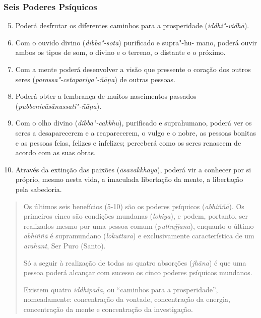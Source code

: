 \clearpage

\subsubsection{Seis Poderes Psíquicos}


\begin{enumerate}
  \setcounter{enumi}{4}
  \item Poderá desfrutar os diferentes caminhos para a prosperidade (\emph{iddhi"-vidhā}).

  \item Com o ouvido divino (\emph{dibba"-sota}) purificado e supra"-hu- mano,
        poderá ouvir ambos os tipos de som, o divino e o terreno, o distante e o
        próximo.

  \item Com a mente poderá desenvolver a visão que pressente o coração dos
        outros seres (\emph{parassa"-cetopariya"-ñāṇa}) de outras pessoas.

  \item Poderá obter a lembrança de muitos nascimentos passados
        (\emph{pubbenivāsānussati"-ñāṇa}).

  \item Com o olho divino (\emph{dibba"-cakkhu}), purificado e suprahumano,
        poderá ver os seres a desaparecerem e a reaparecerem, o vulgo e o nobre,
        as pessoas bonitas e as pessoas feias, felizes e infelizes; perceberá
        como os seres renascem de acordo com as suas obras.

  \item Através da extinção das paixões (\emph{āsavakkhaya}), poderá vir a
        conhecer por si próprio, mesmo nesta vida, a imaculada libertação da
        mente, a libertação pela sabedoria.
\end{enumerate}


\begin{quote}
  Os últimos seis benefícios (5-10) são os poderes psíquicos (\emph{abhiññā}).
  Os primeiros cinco são condições mundanas (\emph{lokiya}), e podem, portanto,
  ser realizados mesmo por uma pessoa comum (\emph{puthujjana}), enquanto o
  último \emph{abhiññā} é supramundano (\emph{lokuttara}) e exclusivamente
  característica de um \emph{arahant}, Ser Puro (Santo).

  Só a seguir à realização de todas as quatro absorções (\emph{jhāna}) é que uma
  pessoa poderá alcançar com sucesso os cinco poderes psíquicos mundanos.

  Existem quatro \emph{iddhipāda}, ou “caminhos para a prosperidade”,
  nomeadamente: concentração da vontade, concentração da energia, concentração
  da mente e concentração da investigação.
\end{quote}

